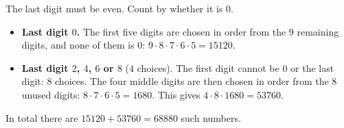 The last digit must be even. Count by whether it is $0$.
\begin{itemize}
\item \textbf{Last digit $0$.} The first five digits are chosen in order from the $9$ remaining digits, and none of them is $0$: $9\cdot8\cdot7\cdot6\cdot5=15120$.
\item \textbf{Last digit $2$, $4$, $6$ or $8$} ($4$ choices). The first digit cannot be $0$ or the last digit: $8$ choices. The four middle digits are then chosen in order from the $8$ unused digits: $8\cdot7\cdot6\cdot5=1680$. This gives $4\cdot8\cdot1680=53760$.
\end{itemize}
In total there are $15120+53760=\boxed{68880}$ such numbers.
